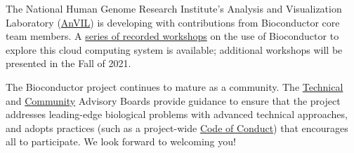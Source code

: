 The National Human Genome Research Institute's Analysis and Visualization
Laboratory (\href{https://anvilproject.org}{AnVIL}) is developing with contributions from Bioconductor
core team members.  A \href{https://docs.google.com/document/u/2/d/e/2PACX-1vSVGCaX-wnWyu1TUhhbsoVeTCJ6ODLG53OeMHKRbewGQOqOcMTnZQl7_jrR9kqOPQPlsFN1ecLT4lhd/pub}{series of recorded workshops} on the use of
Bioconductor to explore this cloud
computing system is available; additional workshops will be presented in the Fall of 2021.



The Bioconductor project continues to mature as a
community. The \href{https://bioconductor.org/about/technical-advisory-board/}{Technical}
and \href{https://bioconductor.org/about/community-advisory-board/}{Community}
Advisory Boards provide guidance to ensure that the project addresses
leading-edge biological problems with advanced technical approaches,
and adopts practices (such as a
project-wide \href{https://bioconductor.org/about/code-of-conduct/}{Code
of Conduct}) that encourages all to participate. We look forward to
welcoming you!

\address{Bioconductor Core Team \\
    Biostatistics and Bioinformatics \\
    Roswell Park Comprehensive Cancer Center, Buffalo, NY \\
    USA}
